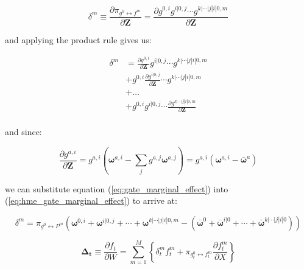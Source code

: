 \documentclass[12pt]{article}
\newcommand{\mean}[1]{\bar{#1}}
\newcommand{\gateprod}[2]{\pi_{#1 \longleftrightarrow #2}}
\begin{document}
\begin{equation}
  \delta^{m} \equiv \frac{\partial \gateprod{g^{0}}{f^{m}}}{\partial \boldsymbol{Z}} = \frac{\partial g^{0, i} g^{i|0, j} \cdots g^{k|\cdots|j|i|0, m}}{\partial \boldsymbol{Z}}
\end{equation}

and applying the product rule gives us:

\begin{equation} \label{eq:hme_gate_marginal_effect}
  \begin{split}
    \delta^{m} &= \frac{\partial g^{0, i}}{\partial \boldsymbol{Z}} g^{i|0, j} \cdots g^{k|\cdots|j|i|0, m}                       \\
                                     &+ g^{0, i} \frac{\partial g^{i|0, j}}{\partial \boldsymbol{Z}} \cdots g^{k|\cdots|j|i|0, m} \\
                                     &+ \dots                                                                                     \\
                                     &+ g^{0, i} g^{i|0, j} \cdots \frac{\partial g^{k|\cdots|j|i|0, m}}{\partial \boldsymbol{Z}} \\
  \end{split}
\end{equation}

and since:

\begin{equation} \label{eq:gate_marginal_effect}
  \frac{\partial g^{a, i}}{\partial \boldsymbol{Z}} = g^{a, i} \left( \boldsymbol{\omega}^{a, i} - \sum_{j} g^{a, j} \boldsymbol{\omega}^{a, j} \right) = g^{a, i} \left( \boldsymbol{\omega}^{a, i} - \mean{\boldsymbol{\omega}}^{a} \right)
\end{equation}

we can substitute equation (\ref{eq:gate_marginal_effect}) into
(\ref{eq:hme_gate_marginal_effect}) to arrive at:

\begin{equation} \label{eq:marginal_effects}
  \delta^{m} = \gateprod{g^{0}}{P^{m}} \left(\boldsymbol{\omega}^{0, i} + \boldsymbol{\omega}^{i|0, j} + \cdots + \boldsymbol{\omega}^{k|\cdots|j|i|0, m} - \left( \mean{\boldsymbol{\omega}}^{0} + \mean{\boldsymbol{\omega}}^{i|0} + \cdots + \mean{\boldsymbol{\omega}}^{k|\cdots|j|i|0} \right) \right)
\end{equation}


\begin{equation} \label{eq:ME_both2}
  \boldsymbol{\Delta_{t}} \equiv \frac{\partial f_{t}}{\partial W} = \sum_{m=1}^{M} \left\{ \delta^{m}_{t} f^{m}_{t} + \gateprod{g^{0}_{t}}{f^{m}_{t}} \frac{\partial f^{m}_{t}}{{\partial X}} \right\}
\end{equation}
\end{document}
